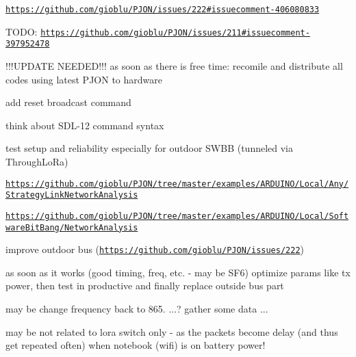\begin{DoxyItemize}
\begin{DoxyItemize}
\begin{DoxyItemize}
\end{DoxyItemize}
\end{DoxyItemize}
\item \href{https://github.com/gioblu/PJON/issues/222#issuecomment-406080833}{\tt https\-://github.\-com/gioblu/\-P\-J\-O\-N/issues/222\#issuecomment-\/406080833}
\item T\-O\-D\-O\-: \href{https://github.com/gioblu/PJON/issues/211#issuecomment-397952478}{\tt https\-://github.\-com/gioblu/\-P\-J\-O\-N/issues/211\#issuecomment-\/397952478}
\begin{DoxyItemize}
\item !!!\-U\-P\-D\-A\-T\-E N\-E\-E\-D\-E\-D!!! as soon as there is free time\-: recomile and distribute all codes using latest P\-J\-O\-N to hardware
\item add reset broadcast command
\item think about S\-D\-L-\/12 command syntax
\item test setup and reliability especially for outdoor S\-W\-B\-B (tunneled via Through\-Lo\-Ra)
\begin{DoxyItemize}
\item \href{https://github.com/gioblu/PJON/tree/master/examples/ARDUINO/Local/Any/StrategyLinkNetworkAnalysis}{\tt https\-://github.\-com/gioblu/\-P\-J\-O\-N/tree/master/examples/\-A\-R\-D\-U\-I\-N\-O/\-Local/\-Any/\-Strategy\-Link\-Network\-Analysis}
\item \href{https://github.com/gioblu/PJON/tree/master/examples/ARDUINO/Local/SoftwareBitBang/NetworkAnalysis}{\tt https\-://github.\-com/gioblu/\-P\-J\-O\-N/tree/master/examples/\-A\-R\-D\-U\-I\-N\-O/\-Local/\-Software\-Bit\-Bang/\-Network\-Analysis}
\end{DoxyItemize}
\item improve outdoor bus (\href{https://github.com/gioblu/PJON/issues/222}{\tt https\-://github.\-com/gioblu/\-P\-J\-O\-N/issues/222})
\begin{DoxyItemize}
\item as soon as it works (good timing, freq, etc. -\/ may be S\-F6) optimize params like tx power, then test in productive and finally replace outside bus part
\begin{DoxyItemize}
\item may be change frequency back to 865. ...? gather some data ...
\end{DoxyItemize}
\item may be not related to lora switch only -\/ as the packets become delay (and thus get repeated often) when notebook (wifi) is on battery power!

\end{DoxyItemize}
\end{DoxyItemize}
\end{DoxyItemize}
